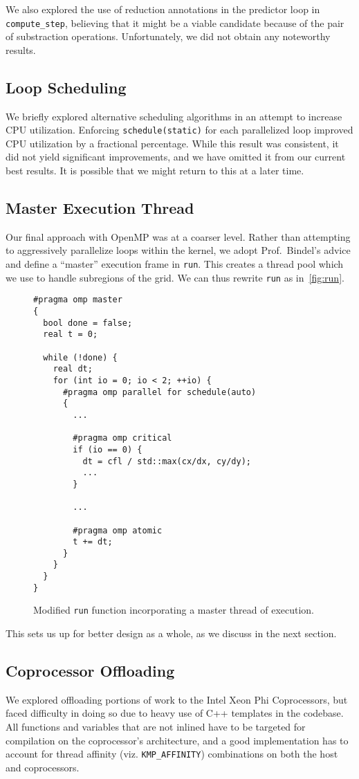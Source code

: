 \documentclass{scrartcl}
\begin{document}
    We also explored the use of reduction annotations in the predictor loop in \verb|compute_step|, believing that it might be a viable candidate because of the pair of substraction operations. Unfortunately, we did not obtain any noteworthy results.

    \subsection{Loop Scheduling}
    We briefly explored alternative scheduling algorithms in an attempt to increase CPU utilization. Enforcing \verb|schedule(static)| for each parallelized loop improved CPU utilization by a fractional percentage. While this result was consistent, it did not yield significant improvements, and we have omitted it from our current best results. It is possible that we might return to this at a later time.

    \subsection{Master Execution Thread}
    Our final approach with OpenMP was at a coarser level. Rather than attempting to aggressively parallelize loops within the kernel, we adopt Prof.~Bindel's advice and define a ``master'' execution frame in \verb|run|. This creates a thread pool which we use to handle subregions of the grid. We can thus rewrite \verb|run| as in~\autoref{fig:run}.
    \begin{figure}[p]
    \begin{lstlisting}
#pragma omp master
{
  bool done = false;
  real t = 0;

  while (!done) {
    real dt;
    for (int io = 0; io < 2; ++io) {
      #pragma omp parallel for schedule(auto)
      {
        ...

        #pragma omp critical
        if (io == 0) {
          dt = cfl / std::max(cx/dx, cy/dy);
          ...
        }

        ...

        #pragma omp atomic
        t += dt;
      }
    }
  }
}
    \end{lstlisting}
    \cprotect\caption{Modified \verb|run| function incorporating a master thread of execution.\label{fig:run}}
    \end{figure}
    This sets us up for better design as a whole, as we discuss in the next section.

    \subsection{Coprocessor Offloading}
    We explored offloading portions of work to the Intel Xeon Phi Coprocessors, but faced difficulty in doing so due to heavy use of C++ templates in the codebase. All functions and variables that are not inlined have to be targeted for compilation on the coprocessor's architecture, and a good implementation has to account for thread affinity (viz. \verb|KMP_AFFINITY|) combinations on both the host and coprocessors.
\end{document}
